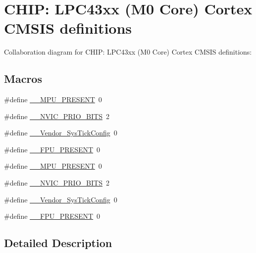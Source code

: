 \hypertarget{group___c_m_s_i_s__43_x_x___m0___c_o_m_m_o_n}{}\section{C\+H\+IP\+: L\+P\+C43xx (M0 Core) Cortex C\+M\+S\+IS definitions}
\label{group___c_m_s_i_s__43_x_x___m0___c_o_m_m_o_n}
Collaboration diagram for C\+H\+IP\+: L\+P\+C43xx (M0 Core) Cortex C\+M\+S\+IS definitions\+:
\subsection*{Macros}
\begin{DoxyCompactItemize}
\item 
\#define \hyperlink{group___c_m_s_i_s__43_x_x___m0___c_o_m_m_o_n_ga4127d1b31aaf336fab3d7329d117f448}{\+\_\+\+\_\+\+M\+P\+U\+\_\+\+P\+R\+E\+S\+E\+NT}~0
\item 
\#define \hyperlink{group___c_m_s_i_s__43_x_x___m0___c_o_m_m_o_n_gae3fe3587d5100c787e02102ce3944460}{\+\_\+\+\_\+\+N\+V\+I\+C\+\_\+\+P\+R\+I\+O\+\_\+\+B\+I\+TS}~2
\item 
\#define \hyperlink{group___c_m_s_i_s__43_x_x___m0___c_o_m_m_o_n_gab58771b4ec03f9bdddc84770f7c95c68}{\+\_\+\+\_\+\+Vendor\+\_\+\+Sys\+Tick\+Config}~0
\item 
\#define \hyperlink{group___c_m_s_i_s__43_x_x___m0___c_o_m_m_o_n_gac1ba8a48ca926bddc88be9bfd7d42641}{\+\_\+\+\_\+\+F\+P\+U\+\_\+\+P\+R\+E\+S\+E\+NT}~0
\item 
\#define \hyperlink{group___c_m_s_i_s__43_x_x___m0___c_o_m_m_o_n_ga4127d1b31aaf336fab3d7329d117f448}{\+\_\+\+\_\+\+M\+P\+U\+\_\+\+P\+R\+E\+S\+E\+NT}~0
\item 
\#define \hyperlink{group___c_m_s_i_s__43_x_x___m0___c_o_m_m_o_n_gae3fe3587d5100c787e02102ce3944460}{\+\_\+\+\_\+\+N\+V\+I\+C\+\_\+\+P\+R\+I\+O\+\_\+\+B\+I\+TS}~2
\item 
\#define \hyperlink{group___c_m_s_i_s__43_x_x___m0___c_o_m_m_o_n_gab58771b4ec03f9bdddc84770f7c95c68}{\+\_\+\+\_\+\+Vendor\+\_\+\+Sys\+Tick\+Config}~0
\item 
\#define \hyperlink{group___c_m_s_i_s__43_x_x___m0___c_o_m_m_o_n_gac1ba8a48ca926bddc88be9bfd7d42641}{\+\_\+\+\_\+\+F\+P\+U\+\_\+\+P\+R\+E\+S\+E\+NT}~0
\end{DoxyCompactItemize}


\subsection{Detailed Description}


